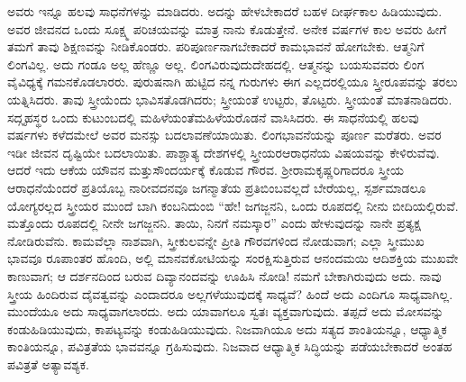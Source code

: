 ಅವರು ಇನ್ನೂ ಹಲವು ಸಾಧನೆಗಳನ್ನು ಮಾಡಿದರು. ಅದನ್ನು ಹೇಳಬೇಕಾದರೆ ಬಹಳ ದೀರ್ಘಕಾಲ ಹಿಡಿಯುವುದು. ಅವರ ಜೀವನದ ಒಂದು ಸೂಕ್ಷ್ಮ ಪರಿಚಯವನ್ನು ಮಾತ್ರ ನಾನು ಕೊಡುತ್ತೇನೆ. ಅನೇಕ ವರ್ಷಗಳ ಕಾಲ ಅವರು ಹೀಗೆ ತಮಗೆ ತಾವು ಶಿಕ್ಷಣವನ್ನು ನೀಡಿಕೊಂಡರು. ಪರಿಪೂರ್ಣನಾಗಬೇಕಾದರೆ ಕಾಮಭಾವನೆ ಹೋಗಬೇಕು. ಆತ್ಮನಿಗೆ ಲಿಂಗವಿಲ್ಲ. ಅದು ಗಂಡೂ ಅಲ್ಲ ಹೆಣ್ಣೂ ಅಲ್ಲ. ಲಿಂಗವಿರುವುದು\break ದೇಹದಲ್ಲಿ. ಆತ್ಮನನ್ನು ಬಯಸುವವರು ಲಿಂಗ ವೈವಿಧ್ಯಕ್ಕೆ ಗಮನಕೊಡಲಾರರು. ಪುರುಷನಾಗಿ ಹುಟ್ಟಿದ ನನ್ನ ಗುರುಗಳು ಈಗ ಎಲ್ಲದರಲ್ಲಿಯೂ ಸ್ತ್ರೀರೂಪವನ್ನು ತರಲು ಯತ್ನಿಸಿದರು. ತಾವು ಸ್ತ್ರೀಯೆಂದು ಭಾವಿಸತೊಡಗಿದರು; ಸ್ತ್ರೀಯಂತೆ ಉಟ್ಟರು, ತೊಟ್ಟರು. ಸ್ತ್ರೀಯಂತೆ ಮಾತನಾಡಿದರು. ಸದ್ಗೃಹಸ್ಥರ ಒಂದು ಕುಟುಂಬದಲ್ಲಿ ಮಹಿಳೆಯಂತೆ\break ಮಹಿಳೆಯರೊಡನೆ ವಾಸಿಸಿದರು. ಈ ಸಾಧನೆಯಲ್ಲಿ ಹಲವು ವರ್ಷಗಳು ಕಳೆದಮೇಲೆ ಅವರ ಮನಸ್ಸು ಬದಲಾವಣೆಯಾಯಿತು. ಲಿಂಗಭಾವನೆಯನ್ನು ಪೂರ್ಣ ಮರೆತರು. ಅವರ ಇಡೀ ಜೀವನ ದೃಷ್ಟಿಯೇ ಬದಲಾಯಿತು. ಪಾಶ್ಚಾತ್ಯ ದೇಶಗಳಲ್ಲಿ ಸ್ತ್ರೀಯರ\break ಆರಾಧನೆಯ ವಿಷಯವನ್ನು ಕೇಳಿರುವೆವು. ಆದರೆ ಇದು ಆಕೆಯ ಯೌವನ ಮತ್ತು\break ಸೌಂದರ್ಯಕ್ಕೆ ಕೊಡುವ ಗೌರವ. ಶ‍್ರೀರಾಮಕೃಷ್ಣರಿಗಾದರೂ ಸ್ತ್ರೀಯ ಆರಾಧನೆಯೆಂದರೆ ಪ್ರತಿಯೊಬ್ಬ ನಾರೀವದನವೂ ಜಗನ್ಮಾತೆಯ ಪ್ರತಿಬಿಂಬವಲ್ಲದೆ ಬೇರೆಯಲ್ಲ, ಸ್ಪರ್ಶ\break ಮಾಡಲೂ ಯೋಗ್ಯರಲ್ಲದ ಸ್ತ್ರೀಯರ ಮುಂದೆ ಬಾಗಿ ಕಂಬನಿದುಂಬಿ “ಹೇ! ಜಗಜ್ಜನನಿ, ಒಂದು ರೂಪದಲ್ಲಿ ನೀನು ಬೀದಿಯಲ್ಲಿರುವೆ. ಮತ್ತೊಂದು ರೂಪದಲ್ಲಿ ನೀನೇ ಜಗಜ್ಜನನಿ. ತಾಯಿ, ನಿನಗೆ ನಮಸ್ಕಾರ” ಎಂದು ಹೇಳುವುದನ್ನು ನಾನೇ ಪ್ರತ್ಯಕ್ಷ ನೋಡಿರುವೆನು. ಕಾಮವೆಲ್ಲಾ ನಾಶವಾಗಿ, ಸ್ತ್ರೀಕುಲವನ್ನೇ ಪ್ರೀತಿ ಗೌರವಗಳಿಂದ ನೋಡುವಾಗ; ಎಲ್ಲಾ ಸ್ತ್ರೀಮುಖ ಭಾವವೂ ರೂಪಾಂತರ ಹೊಂದಿ, ಅಲ್ಲಿ ಮಾನವಕೋಟಿಯನ್ನು ಸಂರಕ್ಷಿಸುತ್ತಿರುವ ಆನಂದಮಯಿ ಆದಿಶಕ್ತಿಯ ಮುಖವೇ ಕಾಣುವಾಗ; ಆ ದರ್ಶನದಿಂದ ಬರುವ ದಿವ್ಯಾನಂದವನ್ನು ಊಹಿಸಿ ನೋಡಿ! ನಮಗೆ ಬೇಕಾಗಿರುವುದು ಅದು. ನಾವು ಸ್ತ್ರೀಯ ಹಿಂದಿರುವ ದೈವತ್ವವನ್ನು ಎಂದಾದರೂ ಅಲ್ಲಗಳೆಯುವುದಕ್ಕೆ ಸಾಧ್ಯವೆ? ಹಿಂದೆ ಅದು ಎಂದಿಗೂ ಸಾಧ್ಯವಾಗಿಲ್ಲ. ಮುಂದೆಯೂ ಅದು ಸಾಧ್ಯವಾಗಲಾರದು. ಅದು ಯಾವಾಗಲೂ ಸ್ವತಃ ವ್ಯಕ್ತವಾಗುವುದು. ತಪ್ಪದೆ ಅದು ಮೋಸವನ್ನು ಕಂಡುಹಿಡಿಯುವುದು, ಕಾಪಟ್ಯವನ್ನು ಕಂಡುಹಿಡಿಯುವುದು. ನಿಜವಾಗಿಯೂ ಅದು ಸತ್ಯದ ಶಾಂತಿಯನ್ನೂ, ಆಧ್ಯಾತ್ಮಿಕ ಕಾಂತಿಯನ್ನೂ, ಪವಿತ್ರತೆಯ ಭಾವವನ್ನೂ ಗ್ರಹಿಸುವುದು. ನಿಜವಾದ ಆಧ್ಯಾತ್ಮಿಕ ಸಿದ್ಧಿಯನ್ನು ಪಡೆಯಬೇಕಾದರೆ ಅಂತಹ ಪವಿತ್ರತೆ ಅತ್ಯಾವಶ್ಯಕ.


